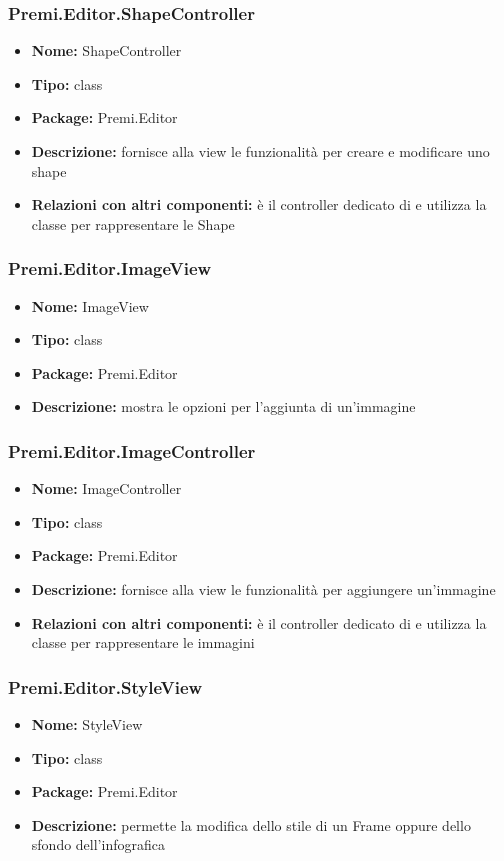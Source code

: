 \subsubsection{Premi.Editor.ShapeController}
\begin{itemize}
  \item \textbf{Nome:} ShapeController
  \item \textbf{Tipo:} class
  \item \textbf{Package:} Premi.Editor
  \item \textbf{Descrizione:} fornisce alla view le funzionalità per creare e modificare uno shape
  \item \textbf{Relazioni con altri componenti:} è il controller dedicato di    e utilizza la classe  per rappresentare le Shape
\end{itemize}
\subsubsection{Premi.Editor.ImageView}
\begin{itemize}
  \item \textbf{Nome:} ImageView
  \item \textbf{Tipo:} class
  \item \textbf{Package:} Premi.Editor
  \item \textbf{Descrizione:} mostra le opzioni per l'aggiunta di un'immagine
\end{itemize}
\subsubsection{Premi.Editor.ImageController}
\begin{itemize}
  \item \textbf{Nome:} ImageController
  \item \textbf{Tipo:} class
  \item \textbf{Package:} Premi.Editor
  \item \textbf{Descrizione:} fornisce alla view le funzionalità per aggiungere un'immagine
  \item \textbf{Relazioni con altri componenti:} è il controller dedicato di    e utilizza la classe  per rappresentare le immagini
\end{itemize}
\subsubsection{Premi.Editor.StyleView}
\begin{itemize}
  \item \textbf{Nome:} StyleView
  \item \textbf{Tipo:} class
  \item \textbf{Package:} Premi.Editor
  \item \textbf{Descrizione:} permette la modifica dello stile di un Frame oppure dello sfondo dell'infografica
\end{itemize}
